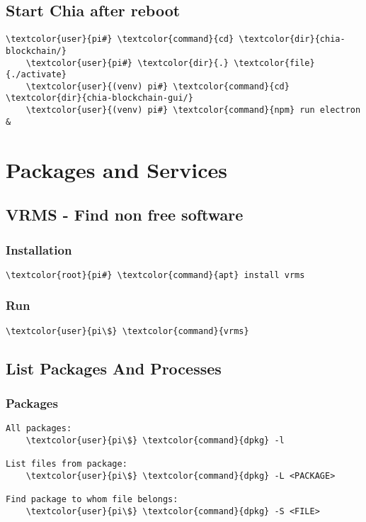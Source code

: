 \documentclass[10pt, a4paper, onecolumn, openany]{book} %
\begin{document}
\section{Start Chia after reboot}
\begin{Verbatim}[commandchars=\\\{\}]
    \textcolor{user}{pi#} \textcolor{command}{cd} \textcolor{dir}{chia-blockchain/}
    \textcolor{user}{pi#} \textcolor{dir}{.} \textcolor{file}{./activate}
    \textcolor{user}{(venv) pi#} \textcolor{command}{cd} \textcolor{dir}{chia-blockchain-gui/}
    \textcolor{user}{(venv) pi#} \textcolor{command}{npm} run electron &
\end{Verbatim}



\chapter{Packages and Services}
\section{VRMS - Find non free software}
\subsection{Installation}
\begin{Verbatim}[commandchars=\\\{\}]
    \textcolor{root}{pi#} \textcolor{command}{apt} install vrms
\end{Verbatim}
\subsection{Run}
\begin{Verbatim}[commandchars=\\\{\}]
    \textcolor{user}{pi\$} \textcolor{command}{vrms}
\end{Verbatim}


\section{List Packages And Processes}
\subsection{Packages}
\begin{Verbatim}[commandchars=\\\{\}]
All packages:
    \textcolor{user}{pi\$} \textcolor{command}{dpkg} -l
    
List files from package:
    \textcolor{user}{pi\$} \textcolor{command}{dpkg} -L <PACKAGE>
    
Find package to whom file belongs:
    \textcolor{user}{pi\$} \textcolor{command}{dpkg} -S <FILE>
\end{Verbatim}
\end{document}
